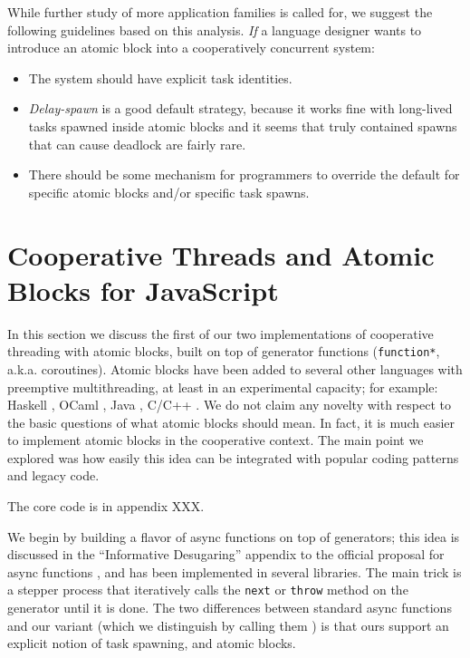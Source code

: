 \documentclass[acmsmall,anonymous,review]{acmart}\settopmatter{printfolios=true,printccs=false,printacmref=false}
\begin{document}
While further study of more application families is called for, we suggest the following guidelines based on this analysis.
\emph{If} a language designer wants to introduce an atomic block into a cooperatively concurrent system:
\begin{itemize}
\item The system should have explicit task identities.
\item \emph{Delay-spawn} is a good default strategy, because it works fine with long-lived tasks spawned inside atomic blocks and it seems that truly contained spawns that can cause deadlock are fairly rare.
\item There should be some mechanism for programmers to override the default for specific atomic blocks and/or specific task spawns.
\end{itemize}

\section{Cooperative Threads and Atomic Blocks for JavaScript}

In this section we discuss the first of our two implementations of cooperative threading with atomic blocks, built on top of generator functions (\texttt{function*}, a.k.a. coroutines).
Atomic blocks have been added to several other languages with preemptive multithreading, at least in an experimental capacity; for example: Haskell \cite{Harris2005}, OCaml \cite{Ringenburg2005}, Java \cite{Herlihy2006}, C/C++ \cite{Ni2008}.
We do not claim any novelty with respect to the basic questions of what atomic blocks should mean.
In fact, it is much easier to implement atomic blocks in the cooperative context.
The main point we explored was how easily this idea can be integrated with popular coding patterns and legacy code.

The core code is in appendix XXX.

We begin by building a flavor of async functions on top of generators; this idea is discussed in the ``Informative Desugaring'' appendix to the official proposal for async functions \cite{Terlson2016}, and has been implemented in several libraries.
The main trick is a stepper process that iteratively calls the \texttt{next} or \texttt{throw} method on the generator until it is done.
The two differences between standard async functions and our variant (which we distinguish by calling them \emph{\asyncs{}}) is that ours support an explicit notion of task spawning, and atomic blocks.
\end{document}
